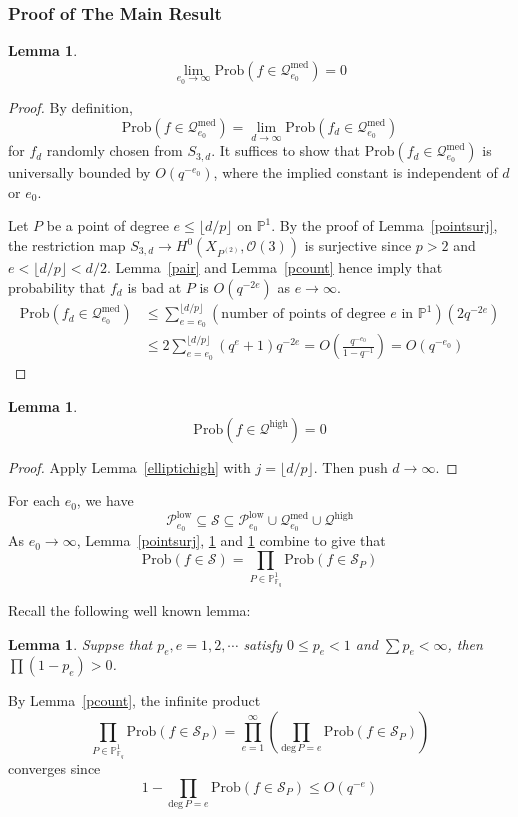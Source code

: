 \documentclass[12pt]{article}
\theoremstyle{plain}
\newtheorem{lemma}[equation]{Lemma}
\theoremstyle{definition}
\newcommand{\IF}{\mathbb{F}}
\newcommand{\IP}{\mathbb{P}}
\newcommand{\sO}{\mathcal{O}}
\newcommand{\sP}{\mathcal{P}}
\newcommand{\sQ}{\mathcal{Q}}
\newcommand{\sS}{\mathcal{S}}
\renewcommand{\deg}{\mathrm{deg}\,}
\newcommand{\<}{\langle}
\renewcommand{\>}{\rangle}
\newcommand{\Prob}{\mathrm{Prob}}
\newcommand{\fl}[1]{\lfloor #1 \rfloor}
\begin{document}
\subsubsection{Proof of The Main Result}
\begin{lemma}
\label{ellipticmed}
$$ \lim_{e_0 \to \infty} \Prob( f \in \sQ_{e_0}^{\mathrm{med}}) = 0 $$
\end{lemma}
\begin{proof}
By definition, 
$$ \Prob( f \in  \sQ_{e_0}^{\mathrm{med}}) = \lim_{d \to \infty} \Prob(f_d \in \sQ_{e_0}^{\mathrm{med}})$$
for $f_d$ randomly chosen from $S_{3, d}$. It suffices to show that $\Prob(f_d \in \sQ_{e_0}^{\mathrm{med}})$ is universally bounded by $O(q^{-e_0})$, where the implied constant is independent of $d$ or $e_0$. 

Let $P$ be a point of degree $e \le \lfloor d/p \rfloor$ on $\IP^1$. By the proof of Lemma~\ref{pointsurj}, the restriction map $S_{3, d} \to H^0(X_{P^{(2)}}, \sO(3))$ is surjective since $p > 2$ and $e < \lfloor d/p \rfloor < d/2$. Lemma~\ref{pair} and Lemma~\ref{pcount} hence imply that probability that $f_d$ is bad at $P$ is $O(q^{-2e})$ as $e \to \infty$. 
\begin{align*}
\Prob(f_d \in \sQ_{e_0}^{\mathrm{med}}) &\le \sum_{e = e_0}^{\lfloor d/p \rfloor} (\text{number of points of degree $e$ in $\IP^1$})(2q^{-2e}) \\
&\le 2 \sum_{e = e_0}^{\lfloor d/p \rfloor}(q^{e} + 1) q^{-2e} = O(\frac{q^{-e_0}}{1 - q^{-1}}) = O(q^{-e_0})
\end{align*} 
\end{proof}

\begin{lemma}
\label{elliptichighf}
$$ \Prob(f \in \sQ^{\mathrm{high}}) = 0 $$
\end{lemma}
\begin{proof}
Apply Lemma~\ref{elliptichigh} with $j = \fl{d/p}$. Then push $d \to \infty$. 
\end{proof}

For each $e_0$, we have 
$$ \sP_{e_0}^{\mathrm{low}} \subseteq \sS \subseteq \sP_{e_0}^{\mathrm{low}} \cup \sQ_{e_0}^{\mathrm{med}} \cup \sQ^{\mathrm{high}}$$
As $e_0 \to \infty$, Lemma~\ref{pointsurj}, \ref{ellipticmed} and \ref{elliptichighf} combine to give that 
$$ \Prob(f \in \sS) = \prod_{P \in \IP^1_{\IF_q}} \Prob( f \in \sS_P) $$

Recall the following well known lemma:
\begin{lemma}
Suppse that $p_e, e = 1, 2, \cdots$ satisfy $0 \le p_e < 1$ and $\sum p_e < \infty$, then $\prod (1 - p_e) > 0$. 
\end{lemma}
By Lemma~\ref{pcount}, the infinite product 
$$ \prod_{P \in \IP^1_{\IF_q}} \Prob( f \in \sS_P) = \prod_{e = 1}^\infty (\prod_{\deg P = e} \Prob(f \in \sS_P))$$
converges since 
$$ 1 - \prod_{\deg P = e} \Prob(f \in \sS_P) \le O(q^{-e})$$
\end{document}
